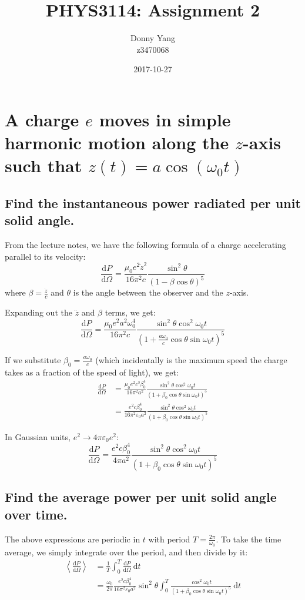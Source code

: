 \documentclass[a4paper]{scrartcl}
\begin{document}
\title{PHYS3114: Assignment 2}
\author{Donny Yang \\ z3470068}
\date{2017-10-27}
\maketitle

\section{A charge \(e\) moves in simple harmonic motion along the \(z\)-axis such that \(z(t) = a \cos(\omega_0 t)\)}
\subsection{Find the instantaneous power radiated per unit solid angle.}
From the lecture notes, we have the following formula of a charge accelerating parallel to its velocity:
\[\frac{\mathrm{d} P}{\mathrm{d} \Omega} = \frac{\mu_0 e^2 \ddot{z}^2}{16 \pi^2 c} \frac{\sin^2 \theta}{(1 - \beta \cos \theta)^5}\]
where \(\beta = \frac{\dot{z}}{c}\) and \(\theta\) is the angle between the observer and the \(z\)-axis.

Expanding out the \(\ddot{z}\) and \(\beta\) terms, we get:
\[\frac{\mathrm{d} P}{\mathrm{d} \Omega} = \frac{\mu_0 e^2 a^2 \omega_0^4}{16 \pi^2 c} \frac{\sin^2 \theta \cos^2 \omega_0 t}{(1 + \frac{a \omega_0}{c} \cos \theta \sin \omega_0 t)^5}\]

If we substitute \(\beta_0 = \frac{a \omega_0}{c}\) (which incidentally is the maximum speed the charge takes as a fraction of the speed of light), we get:
\begin{align*}
    \frac{\mathrm{d} P}{\mathrm{d} \Omega} &= \frac{\mu_0 e^2 c^3 \beta_0^4}{16 \pi^2 a^2} \frac{\sin^2 \theta \cos^2 \omega_0 t}{(1 + \beta_0 \cos \theta \sin \omega_0 t)^5} \\
    &= \frac{e^2 c \beta_0^4}{16 \pi^2 \varepsilon_0 a^2} \frac{\sin^2 \theta \cos^2 \omega_0 t}{(1 + \beta_0 \cos \theta \sin \omega_0 t)^5}
\end{align*}

In Gaussian units, \(e^2 \to 4 \pi \varepsilon_0 e^2\):
\[\frac{\mathrm{d} P}{\mathrm{d} \Omega} = \frac{e^2 c \beta_0^4}{4 \pi a^2} \frac{\sin^2 \theta \cos^2 \omega_0 t}{(1 + \beta_0 \cos \theta \sin \omega_0 t)^5}\]

\subsection{Find the average power per unit solid angle over time.}
The above expressions are periodic in \(t\) with period \(T = \frac{2 \pi}{\omega_0}\). To take the time average, we simply integrate over the period, and then divide by it:
\begin{align*}
    \left\langle \frac{\mathrm{d} P}{\mathrm{d} \Omega} \right\rangle &= \frac{1}{T} \int_0^T \frac{\mathrm{d} P}{\mathrm{d} \Omega} \:\mathrm{d} t \\
    &= \frac{\omega_0}{2 \pi} \frac{e^2 c \beta_0^4}{16 \pi^2 \varepsilon_0 a^2} \sin^2 \theta \int_0^T \frac{\cos^2 \omega_0 t}{(1 + \beta_0 \cos \theta \sin \omega_0 t)^5} \:\mathrm{d} t
\end{align*}
\end{document}
